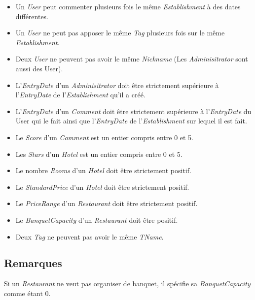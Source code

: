 \documentclass[11pt,a4paper]{report}
\begin{document}
\begin{itemize}
\item Un \textit{User} peut commenter plusieurs fois le même \textit{Establishment} à des dates différentes. 
\item Un \textit{User} ne peut pas apposer le même \textit{Tag} plusieurs fois sur le même \textit{Establishment}.
\item Deux \textit{User} ne peuvent pas avoir le même \textit{Nickname} (Les \textit{Adminisitrator} sont aussi des User).
\item L'\textit{EntryDate} d'un \textit{Adminisitrator} doit être strictement supérieure à l'\textit{EntryDate} de l'\textit{Establishment} qu'il a créé.
\item L'\textit{EntryDate} d'un \textit{Comment} doit être strictement supérieure à l'\textit{EntryDate} du User qui le fait ainsi que l'\textit{EntryDate} de l'\textit{Establishment} sur lequel il est fait. 
\item Le \textit{Score} d'un \textit{Comment} est un entier compris entre 0 et 5.
\item Les \textit{Stars} d'un \textit{Hotel} est un entier compris entre 0 et 5.
\item Le nombre \textit{Rooms} d'un \textit{Hotel} doit être strictement positif. 
\item Le \textit{StandardPrice} d'un \textit{Hotel} doit être strictement positif. 
\item Le \textit{PriceRange} d'un \textit{Restaurant} doit être strictement positif. 
\item Le \textit{BanquetCapacity} d'un \textit{Restaurant} doit être positif. 
\item Deux \textit{Tag} ne peuvent pas avoir le même \textit{TName}.
\end{itemize}
\subsection*{Remarques}
Si un \textit{Restaurant} ne veut pas organiser de banquet, il spécifie sa \textit{BanquetCapacity} comme étant 0.
\end{document}
